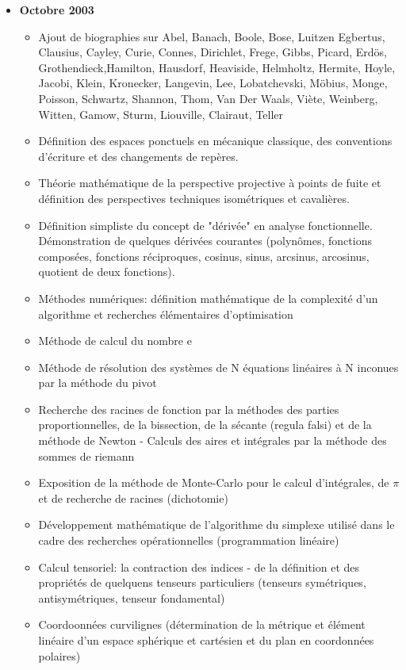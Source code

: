 \documentclass[12pt,a4paper,twoside,openright]{report}
\theoremstyle{definition}
\theoremstyle{itexmp}
\numberwithin{equation}{section}
\begin{document}
\begin{itemize}
		\item \textbf{Octobre 2003}
			\begin{itemize}[noitemsep]
				\item Ajout de biographies sur Abel, Banach, Boole, Bose, Luitzen Egbertus, Clausius, Cayley, Curie, Connes, Dirichlet, Frege, Gibbs, Picard, Erdös, Grothendieck,Hamilton, Hausdorf, Heaviside, Helmholtz, Hermite, Hoyle, Jacobi, Klein, Kronecker, Langevin, Lee, Lobatchevski, Möbius, Monge, Poisson, Schwartz, Shannon, Thom, Van Der Waals, Viète, Weinberg, Witten, Gamow, Sturm, Liouville, Clairaut, Teller
				\item Définition des espaces ponctuels en mécanique classique, des conventions d'écriture et des changements de repères.
				\item Théorie mathématique de la perspective projective à points de fuite et définition des perspectives techniques isométriques et cavalières.
				\item Définition simpliste du concept de "dérivée" en analyse fonctionnelle. Démonstration de quelques dérivées courantes (polynômes, fonctions composées, fonctions réciproques, cosinus, sinus, arcsinus, arcosinus, quotient de deux fonctions).
				\item Méthodes numériques: définition mathématique de la complexité d'un algorithme et recherches élémentaires d'optimisation
				\item Méthode de calcul du nombre e
				\item Méthode de résolution des systèmes de N équations linéaires à N inconues par la méthode du pivot 
				\item Recherche des racines de fonction par la méthodes des parties proportionnelles, de la bissection, de la sécante (regula falsi) et de la méthode de Newton - Calculs des aires et intégrales par la méthode des sommes de riemann 
				\item Exposition de la méthode de Monte-Carlo pour le calcul d'intégrales, de $\pi$ et de recherche de racines (dichotomie) 
				\item Développement mathématique de l'algorithme du simplexe utilisé dans le cadre des recherches opérationnelles (programmation linéaire) 
				\item Calcul tensoriel: la contraction des indices - de la définition et des propriétés de quelquens tenseurs particuliers (tenseurs symétriques, antisymétriques, tenseur fondamental) 
				\item Coordoonnées curvilignes (détermination de la métrique et élément linéaire d'un espace sphérique et cartésien et du plan en coordonnées polaires) 

\end{itemize}
\end{itemize}
\end{document}
